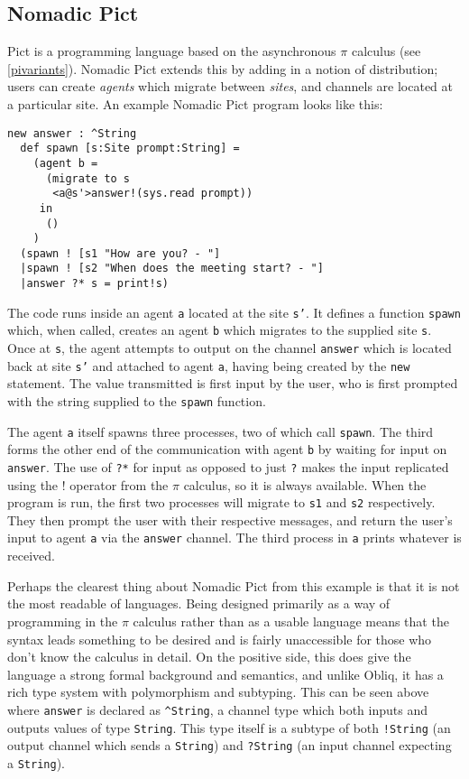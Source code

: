 \subsection{Nomadic Pict}

Pict is a programming language based on the asynchronous $\pi$
calculus (see \ref{pivariants}).  Nomadic Pict extends this by adding
in a notion of distribution; users can create \emph{agents} which
migrate between \emph{sites}, and channels are located at a particular
site.  An example Nomadic Pict program looks like this:

\begin{verbatim}
new answer : ^String
  def spawn [s:Site prompt:String] =
    (agent b =
      (migrate to s
       <a@s'>answer!(sys.read prompt))
     in
      ()
    )
  (spawn ! [s1 "How are you? - "]
  |spawn ! [s2 "When does the meeting start? - "]
  |answer ?* s = print!s)
\end{verbatim}

The code runs inside an agent \texttt{a} located at the site
\texttt{s'}.  It defines a function \texttt{spawn} which, when called,
creates an agent \texttt{b} which migrates to the supplied site
\texttt{s}.  Once at \texttt{s}, the agent attempts to output on the
channel \texttt{answer} which is located back at site \texttt{s'} and
attached to agent \texttt{a}, having being created by the \texttt{new}
statement.  The value transmitted is first input by the user, who is
first prompted with the string supplied to the \texttt{spawn}
function.

The agent \texttt{a} itself spawns three processes, two of which call
\texttt{spawn}.  The third forms the other end of the communication
with agent \texttt{b} by waiting for input on \texttt{answer}.  The
use of \texttt{?*} for input as opposed to just \texttt{?} makes the
input replicated using the $!$ operator from the $\pi$ calculus, so it
is always available.  When the program is run, the first two processes
will migrate to \texttt{s1} and \texttt{s2} respectively.  They then
prompt the user with their respective messages, and return the user's
input to agent \texttt{a} via the \texttt{answer} channel.  The third
process in \texttt{a} prints whatever is received.

Perhaps the clearest thing about Nomadic Pict from this example is
that it is not the most readable of languages.  Being designed
primarily as a way of programming in the $\pi$ calculus rather than as
a usable language means that the syntax leads something to be desired
and is fairly unaccessible for those who don't know the calculus in
detail.  On the positive side, this does give the language a strong
formal background and semantics, and unlike Obliq, it has a rich type
system with polymorphism and subtyping. This can be seen above where
\texttt{answer} is declared as \texttt{\textasciicircum String}, a channel type which
both inputs and outputs values of type \texttt{String}.  This type
itself is a subtype of both \texttt{!String} (an output channel which
sends a \texttt{String}) and \texttt{?String} (an input channel
expecting a \texttt{String}).


